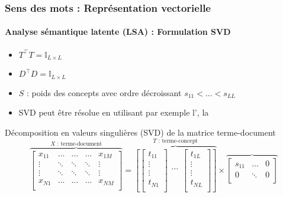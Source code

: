 \documentclass[xcolor=table]{beamer}
\begin{document}
\begin{frame}
	\frametitle{Sens des mots : Représentation vectorielle}
	\framesubtitle{Analyse sémantique latente (LSA) : Formulation SVD}
	
	\begin{itemize}
		\item $T^\top T = \mathbb{I}_{L \times L}$ 
		\item $D^\top D = \mathbb{I}_{L \times L}$ 
		\item $S$ : poids des concepts avec ordre décroissant $s_{11} < ... < s_{LL}$ 
		\item SVD peut être résolue en utilisant par exemple l', la 
	\end{itemize}
	
	\begin{block}{Décomposition en valeurs singulières (SVD) de la matrice terme-document}
		\scriptsize\bfseries
		\[
		\overbrace{
			\begin{bmatrix}
			x_{11} & \ldots & \ldots & \ldots & x_{1M} \\ 
			\vdots & \ddots & \ddots & \ddots &\vdots \\
			\vdots & \ddots & \ddots & \ddots &\vdots \\
			x_{N1} & \ldots & \ldots & \ldots & x_{NM} \\ 
			\end{bmatrix}
		}^{X \text{ : terme-document}}
		=
		\overbrace{
			\left[
			\begin{bmatrix}
			t_{11} \\ 
			\vdots \\
			\vdots \\
			t_{N1} \\ 
			\end{bmatrix}
			\begin{matrix}
			\ldots \\ 
			\end{matrix}
			\begin{bmatrix}
			t_{1L} \\ 
			\vdots \\
			\vdots \\
			t_{NL} \\ 
			\end{bmatrix}
			\right]
		}^{T \text{ : terme-concept}}
		\times 
		\overbrace{
			\begin{bmatrix}
			s_{11} & \ldots & 0 \\
			0 & \ddots & 0 \\

\end{bmatrix}}\]
\end{block}
\end{frame}
\end{document}
